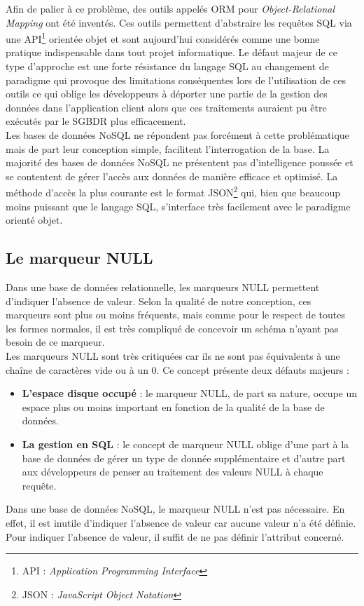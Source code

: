   Afin de palier à ce problème, des outils appelés ORM pour \textit{Object-Relational Mapping} ont été inventés. Ces outils permettent d'abstraire les requêtes SQL via une API\footnote{API : \textit{Application Programming Interface}} orientée objet et sont aujourd'hui considérés comme une bonne pratique indispensable dans tout projet informatique. Le défaut majeur de ce type d'approche est une forte résistance du langage SQL au changement de paradigme qui provoque des limitations conséquentes lors de l'utilisation de ces outils ce qui oblige les développeurs à déporter une partie de la gestion des données dans l'application client alors que ces traitements auraient pu être exécutés par le SGBDR plus efficacement.\\

  Les bases de données NoSQL ne répondent pas forcément à cette problématique mais de part leur conception simple, facilitent l'interrogation de la base. La majorité des bases de données NoSQL ne présentent pas d'intelligence poussée et se contentent de gérer l'accès aux données de manière efficace et optimisé. La méthode d'accès la plus courante est le format JSON\footnote{JSON : \textit{JavaScript Object Notation}} qui, bien que beaucoup moins puissant que le langage SQL, s'interface très facilement avec le paradigme orienté objet.


\subsection{Le marqueur NULL}
  Dans une base de données relationnelle, les marqueurs  NULL permettent d'indiquer l'absence de valeur. Selon la qualité de notre conception, ces marqueurs sont plus ou moins fréquents, mais comme pour le respect de toutes les formes normales, il est très compliqué de concevoir un schéma n'ayant pas besoin de ce marqueur.\\

  Les marqueurs NULL sont très critiquées car ils ne sont pas équivalents à une chaîne de caractères vide ou à un 0. Ce concept présente deux défauts majeurs :
  \vspace{10px}
  \begin{itemize}
    \item \textbf{L'espace disque occupé} : le marqueur NULL, de part sa nature, occupe un espace plus ou moins important en fonction de la qualité de la base de données.
    \item \textbf{La gestion en SQL} : le concept de marqueur NULL oblige d'une part à la base de données de gérer un type de donnée supplémentaire et d'autre part aux développeurs de penser au traitement des valeurs NULL à chaque requête.
  \end{itemize}
  \vspace{20px}

  Dans une base de données NoSQL, le marqueur NULL n'est pas nécessaire. En effet, il est inutile d'indiquer l'absence de valeur car aucune valeur n'a été définie. Pour indiquer l'absence de valeur, il suffit de ne pas définir l'attribut concerné.
